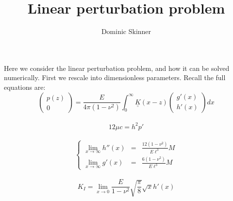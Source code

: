 \documentclass{article}
\begin{document}
\title{Linear perturbation problem}
\author{Dominic Skinner}
\maketitle
Here we consider the linear perturbation problem, and how it can be solved
numerically. First we rescale into dimensionless parameters. Recall the full
equations are:
\begin{equation}
 \left( \begin{array}{c} p(z) \\ 0 \end{array} \right) =
\frac{E}{4\pi (1-\nu^2)} \int_0^{\infty} 
\underline{\underline{K}}(x-z) 
\left( \begin{array}{c} g'(x) \\ h'(x) \end{array} \right) dx
\end{equation}
\\
\begin{equation}
12\mu c = h^2 p'
\end{equation}
\\
\begin{equation}
\left\{ \begin{array}{ccc}
\displaystyle \lim_{x\to\infty} h''(x) & = & \frac{12(1-\nu^2)}{E\ell^3} M \\
\displaystyle \lim_{x\to\infty} g'(x) & = & \frac{6(1-\nu^2)}{E\ell^3} M 
\end{array} \right.
\end{equation}
\\
\begin{equation}
K_I = \lim_{x\to 0} \frac{E}{1-\nu^2} \sqrt{\frac{\pi}{8}} \sqrt{x} h'(x)
\end{equation}
\\
\end{document}
